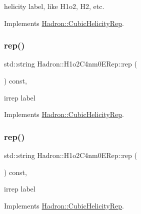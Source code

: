 helicity label, like H1o2, H2, etc. 

Implements \mbox{\hyperlink{structHadron_1_1CubicHelicityRep_af1096946b7470edf0a55451cc662f231}{Hadron\+::\+Cubic\+Helicity\+Rep}}.

\mbox{\label{structHadron_1_1H1o2C4nm0ERep_aec9bc604007b15cc42d00f7e75bba38a}} 
\subsubsection{\texorpdfstring{rep()}{rep()}\hspace{0.1cm}{\footnotesize\ttfamily [1/2]}}
{\footnotesize\ttfamily std\+::string Hadron\+::\+H1o2\+C4nm0\+E\+Rep\+::rep (\begin{DoxyParamCaption}{ }\end{DoxyParamCaption}) const\hspace{0.3cm}{\ttfamily [inline]}, {\ttfamily [virtual]}}

irrep label 

Implements \mbox{\hyperlink{structHadron_1_1CubicHelicityRep_a8cdd86f068a167dc96faef02bfb8a33d}{Hadron\+::\+Cubic\+Helicity\+Rep}}.

\mbox{\label{structHadron_1_1H1o2C4nm0ERep_aec9bc604007b15cc42d00f7e75bba38a}} 
\subsubsection{\texorpdfstring{rep()}{rep()}\hspace{0.1cm}{\footnotesize\ttfamily [2/2]}}
{\footnotesize\ttfamily std\+::string Hadron\+::\+H1o2\+C4nm0\+E\+Rep\+::rep (\begin{DoxyParamCaption}{ }\end{DoxyParamCaption}) const\hspace{0.3cm}{\ttfamily [inline]}, {\ttfamily [virtual]}}

irrep label 

Implements \mbox{\hyperlink{structHadron_1_1CubicHelicityRep_a8cdd86f068a167dc96faef02bfb8a33d}{Hadron\+::\+Cubic\+Helicity\+Rep}}.

\mbox{\label{structHadron_1_1H1o2C4nm0ERep_a083d0736946f0404ac8639fd8a954a9d}} 
